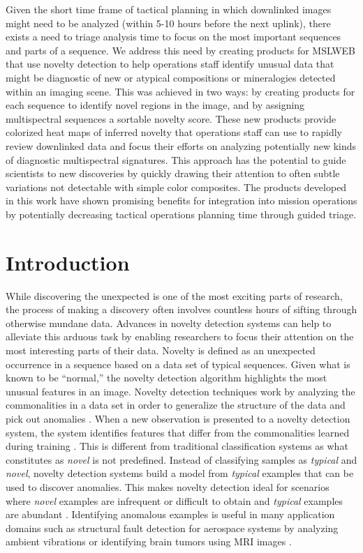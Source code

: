 Given the short time frame of tactical planning in which downlinked images might need to be analyzed (within 5-10 hours before the next uplink), there exists a need to triage analysis time to focus on the most important sequences and parts of a sequence. 
We address this need by creating products for MSLWEB that use novelty detection to help operations staff identify unusual data that might be diagnostic of new or atypical compositions or mineralogies detected within an imaging scene. 
This was achieved in two ways: by creating products for each sequence to identify novel regions in the image, and by assigning multispectral sequences a sortable novelty score. 
These new products provide colorized heat maps of inferred novelty that operations staff can use to rapidly review downlinked data and focus their efforts on analyzing potentially new kinds of diagnostic multispectral signatures. 
This approach has the potential to guide scientists to new discoveries by quickly drawing their attention to often subtle variations not detectable with simple color composites.
The products developed in this work have shown promising benefits for integration into mission operations by potentially decreasing tactical operations planning time through guided triage.

\section{Introduction}
While discovering the unexpected is one of the most exciting parts of research, the process of making a discovery often involves countless hours of sifting through otherwise mundane data. 
Advances in novelty detection systems can help to alleviate this arduous task by enabling researchers to focus their attention on the most interesting parts of their data. 
Novelty is defined as an unexpected occurrence in a sequence based on a data set of typical sequences.
Given what is known to be “normal,” the novelty detection algorithm highlights the most unusual features in an image. 
Novelty detection techniques work by analyzing the commonalities in a data set in order to generalize the structure of the data and pick out anomalies \parencite{japkowicz1995novelty}.
When a new observation is presented to a novelty detection system, the system identifies features that differ from the commonalities learned during training \parencite{markou2003novelty}.
This is different from traditional classification systems as what constitutes as \textit{novel} is not predefined. 
Instead of classifying samples as \textit{typical} and \textit{novel}, novelty detection systems build a model from \textit{typical} examples that can be used to discover anomalies. 
This makes novelty detection ideal for scenarios where \textit{novel} examples are infrequent or difficult to obtain and \textit{typical} examples are abundant \parencite{japkowicz1995novelty}.
Identifying anomalous examples is useful in many application domains such as structural fault detection for aerospace systems by analyzing ambient vibrations \parencite{worden1997structural} or identifying brain tumors using MRI images \parencite{wang2020brain}.

